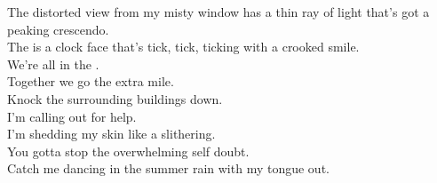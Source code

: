 
The distorted view from my misty window has a thin ray of light that's got a peaking crescendo. \\
The  is a clock face that's tick, tick, ticking with a crooked smile. \\
We're all in the . \\
Together we go the extra mile. \\

Knock the surrounding buildings down. \\
I'm calling out for help. \\
I'm shedding my skin like a  slithering. \\
You gotta stop the overwhelming self doubt. \\
Catch me dancing in the summer rain with my tongue out. \\
